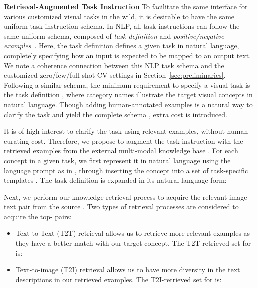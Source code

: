\documentclass[10pt,twocolumn,letterpaper]{article}
\renewcommand{\paragraph}[1]{\vspace{1.25mm}\noindent\textbf{#1}}
\begin{document}
\paragraph{Retrieval-Augmented Task Instruction}
To facilitate the same interface for various customized visual tasks in the wild, it is desirable to have the same uniform task instruction schema. In NLP,  all task instructions can follow the same uniform schema, composed of {\it task definition} and {\it positive/negative examples}~\cite{mishra2021cross,wang2022benchmarking}. Here, the task definition defines a given task in natural language, completely specifying how an input is expected to be mapped to an output text. We note a coherence connection between this NLP task schema and the customized  zero/few/full-shot CV settings in Section~\ref{sec:preliminaries}. Following a similar schema, the minimum requirement to specify a visual task is the task definition , where category names illustrate the target visual concepts in natural language. Though adding human-annotated examples is a natural way to clarify the task and yield the complete schema , extra cost is introduced. 

It is of high interest to clarify the task using relevant examples, without human curating cost. Therefore, we propose to augment the task instruction with the retrieved examples from the external multi-modal knowledge base . 
For each concept  in a given task, we first represent it in natural language  using the language prompt as in \cite{radford2021learning}, through inserting the concept into a set of task-specific templates . The task definition is expanded in its natural language form: 


Next, we perform our knowledge retrieval process to acquire the relevant image-text pair  from the source . Two types of retrieval processes are considered to acquire the top- pairs: 

\begin{itemize}[leftmargin=4.5mm]
\vspace{1mm}
\item  Text-to-Text (T2T) retrieval allows us to retrieve more relevant examples as they have a better match with our target concept. The T2T-retrieved set for  is:


\vspace{-3mm}
\item  
Text-to-image (T2I) retrieval allows us to have more diversity in the text descriptions in our retrieved examples. The T2I-retrieved set for  is:

\end{itemize}
\end{document}
